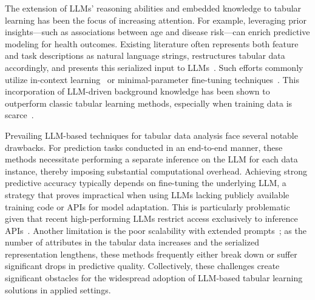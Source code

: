 The extension of LLMs’ reasoning abilities and embedded knowledge to tabular learning has been the focus of increasing attention. For example, leveraging prior insights—such as associations between age and disease risk—can enrich predictive modeling for health outcomes. Existing literature often represents both feature and task descriptions as natural language strings, restructures tabular data accordingly, and presents this serialized input to LLMs~\cite{dinh2022lift,wang2023anypredict}. Such efforts commonly utilize in-context learning~\cite{nam2023semi} or minimal-parameter fine-tuning techniques~\cite{dinh2022lift,hegselmann2023tabllm}. This incorporation of LLM-driven background knowledge has been shown to outperform classic tabular learning methods, especially when training data is scarce~\cite{hegselmann2023tabllm}.

Prevailing LLM-based techniques for tabular data analysis face several notable drawbacks. For prediction tasks conducted in an end-to-end manner, these methods necessitate performing a separate inference on the LLM for each data instance, thereby imposing substantial computational overhead. Achieving strong predictive accuracy typically depends on fine-tuning the underlying LLM, a strategy that proves impractical when using LLMs lacking publicly available training code or APIs for model adaptation. This is particularly problematic given that recent high-performing LLMs restrict access exclusively to inference APIs~\cite{anil2023palm,openai2023gpt4}. Another limitation is the poor scalability with extended prompts~\cite{liu2023lost}; as the number of attributes in the tabular data increases and the serialized representation lengthens, these methods frequently either break down or suffer significant drops in predictive quality. Collectively, these challenges create significant obstacles for the widespread adoption of LLM-based tabular learning solutions in applied settings.

